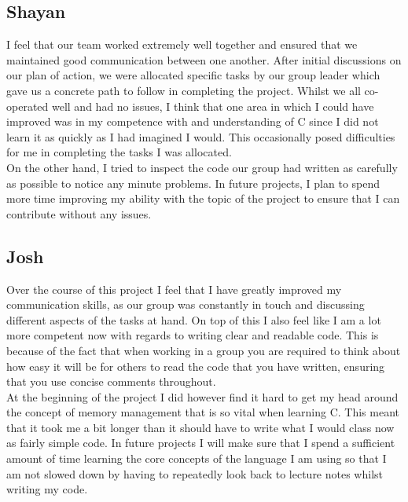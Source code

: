 \documentclass[11pt]{article}
\begin{document}
\subsection{Shayan}
I feel that our team worked extremely well together and ensured that we maintained good communication between one another. After initial discussions on our plan of action, we were allocated specific tasks by our group leader which gave us a concrete path to follow in completing the project. Whilst we all co-operated well and had no issues, I think that one area in which I could have improved was in my competence with and understanding of C since I did not learn it as quickly as I had imagined I would. This occasionally posed difficulties for me in completing the tasks I was allocated. \\

On the other hand, I tried to inspect the code our group had written as carefully as possible to notice any minute problems. In future projects, I plan to spend more time improving my ability with the topic of the project to ensure that I can contribute without any issues.  

\subsection{Josh}
Over the course of this project I feel that I have greatly improved my communication skills, as our group was constantly in touch and discussing different aspects of the tasks at hand. On top of this I also feel like I am a lot more competent now with regards to writing clear and readable code. This is because of the fact that when working in a group you are required to think about how easy it will be for others to read the code that you have written, ensuring that you use concise comments throughout. \\

At the beginning of the project I did however find it hard to get my head around the concept of memory management that is so vital when learning C. This meant that it took me a bit longer than it should have to write what I would class now as fairly simple code. In future projects I will make sure that I spend a sufficient amount of time learning the core concepts of the language I am using so that I am not slowed down by having to repeatedly look back to lecture notes whilst writing my code.
\end{document}
